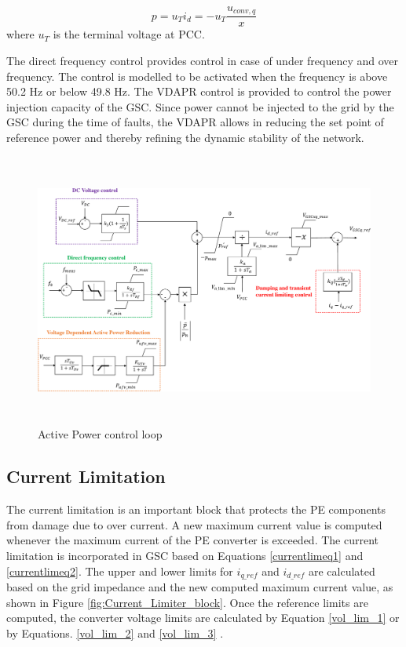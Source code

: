 \begin{equation}\label{P_eq}
    p = u_Ti_d = -u_T\frac{u_{conv,q}}{x}
\end{equation}
where $u_T$ is the terminal voltage at PCC.

The direct frequency control provides control in case of under frequency and over frequency. The control is modelled to be activated when the frequency is above 50.2 Hz or below 49.8 Hz.
The VDAPR control is provided to control the power injection capacity of the \gls{GSC}. Since power cannot be injected to the grid by the \gls{GSC} during the time of faults, the VDAPR allows in reducing the set point of reference power and thereby refining the dynamic stability of the network. 
\begin{figure}[H]
\centering
    \includegraphics[height = 9cm,width = 14.5cm]{Diagrams/Chapter_3/Active_power_loop_withfreq.pdf}
    \caption{Active Power control loop \cite{korai_dynamic_2019}}
    \label{fig:Active_Power_Control_Loop}
\end{figure}

\subsection{Current Limitation}\label{currentlimitation_RSCAD}
The current limitation is an important block that protects the \gls{PE} components from damage due to over current. A new maximum current value is computed whenever the maximum current of the \gls{PE} converter is exceeded. The current limitation is incorporated in \gls{GSC} based on Equations \ref{currentlimeq1} and \ref{currentlimeq2}. The upper and lower limits for $i_{q\_ref}$ and $i_{d\_ref}$ are calculated based on the grid impedance and the new computed maximum current value, as shown in Figure \ref{fig:Current_Limiter_block}. 
Once the reference limits are computed, the converter voltage limits are calculated by Equation \ref{vol_lim_1} or by Equations. \ref{vol_lim_2} and \ref{vol_lim_3} \cite{korai_dynamic_2019}.


